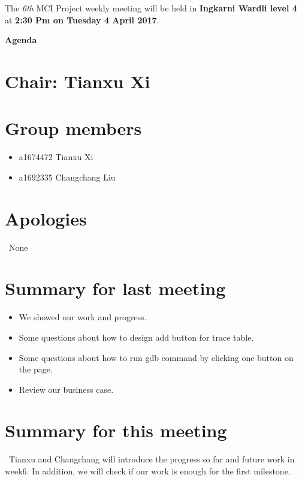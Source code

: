 \documentclass[11pt, a4paper]{article}
\begin{document}
\noindent The {\em 6th} MCI Project weekly meeting will be held in {\bf Ingkarni Wardli level 4} at {\bf 2:30 Pm on Tuesday 4 April 2017}.


\vspace*{15pt}

\begin{center}
\huge \bf Agenda
\end{center}



\section*{Chair: Tianxu Xi           }
\section{Group members}
\begin{itemize}
	\item a1674472  Tianxu Xi
	\item a1692335 Changchang Liu
\end{itemize}

\section{Apologies}
\ None \\


\section{Summary for last meeting}
\begin {itemize} 
\item We showed our work and progress. 
\item Some questions about how to design add button for trace table.
\item Some questions about how to run gdb command by clicking one button on the page.
\item Review our business case.
\end {itemize}


\section{Summary for this meeting}
\ Tianxu and Changchang will introduce the progress so far and future work in week6. In addition, we will check if our work is enough for the first milestone. \\
\end{document}
